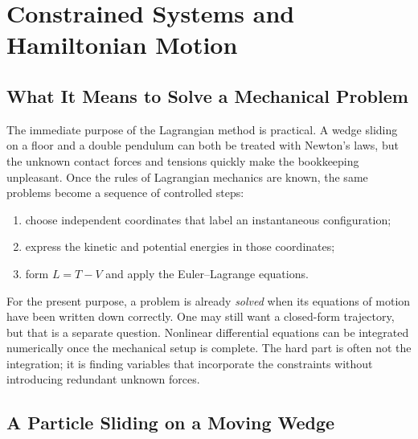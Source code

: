 \chapter{Constrained Systems and Hamiltonian Motion}


\section{What It Means to Solve a Mechanical Problem}

The immediate purpose of the Lagrangian method is practical.  A wedge sliding
on a floor and a double pendulum can both be treated with Newton's laws, but the
unknown contact forces and tensions quickly make the bookkeeping unpleasant.
Once the rules of Lagrangian mechanics are known, the same problems become a
sequence of controlled steps:
\begin{enumerate}
  \item choose independent coordinates that label an instantaneous
  configuration;
  \item express the kinetic and potential energies in those coordinates;
  \item form \(L=T-V\) and apply the Euler--Lagrange equations.
\end{enumerate}

For the present purpose, a problem is already \emph{solved} when its equations
of motion have been written down correctly.  One may still want a closed-form
trajectory, but that is a separate question.  Nonlinear differential equations
can be integrated numerically once the mechanical setup is complete.  The hard
part is often not the integration; it is finding variables that incorporate the
constraints without introducing redundant unknown forces.

\section{A Particle Sliding on a Moving Wedge}

